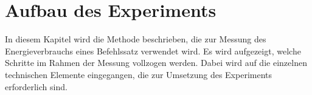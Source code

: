 \chapter{Aufbau des Experiments}

In diesem Kapitel wird die Methode beschrieben, die zur Messung des Energieverbrauchs eines Befehlssatz verwendet wird. Es wird aufgezeigt, welche Schritte im Rahmen der Messung vollzogen werden. Dabei wird auf die einzelnen technischen Elemente eingegangen, die zur Umsetzung des Experiments erforderlich sind. 